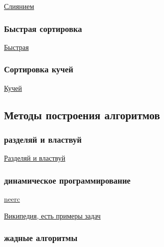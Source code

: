 \documentclass{article}
\begin{document}
\href{https://neerc.ifmo.ru/wiki/index.php?title=%D0%A1%D0%BE%D1%80%D1%82%D0%B8%D1%80%D0%BE%D0%B2%D0%BA%D0%B0_%D1%81%D0%BB%D0%B8%D1%8F%D0%BD%D0%B8%D0%B5%D0%BC}{Слиянием}

\subsubsection{Быстрая сортировка}

\href{https://neerc.ifmo.ru/wiki/index.php?title=%D0%91%D1%8B%D1%81%D1%82%D1%80%D0%B0%D1%8F_%D1%81%D0%BE%D1%80%D1%82%D0%B8%D1%80%D0%BE%D0%B2%D0%BA%D0%B0}{Быстрая}

\subsubsection{Сортировка кучей}

\href{https://neerc.ifmo.ru/wiki/index.php?title=%D0%A1%D0%BE%D1%80%D1%82%D0%B8%D1%80%D0%BE%D0%B2%D0%BA%D0%B0_%D0%BA%D1%83%D1%87%D0%B5%D0%B9}{Кучей}

\subsection{Методы построения алгоритмов}

\subsubsection{разделяй и властвуй}

\href{https://codechick.io/tutorials/dsa/dsa-divide-and-conquer}{Разделяй и властвуй}

\subsubsection{динамическое программирование}

\href{https://neerc.ifmo.ru/wiki/index.php?title=%D0%94%D0%B8%D0%BD%D0%B0%D0%BC%D0%B8%D1%87%D0%B5%D1%81%D0%BA%D0%BE%D0%B5_%D0%BF%D1%80%D0%BE%D0%B3%D1%80%D0%B0%D0%BC%D0%BC%D0%B8%D1%80%D0%BE%D0%B2%D0%B0%D0%BD%D0%B8%D0%B5}{neerc}

\href{https://ru.wikipedia.org/wiki/%D0%94%D0%B8%D0%BD%D0%B0%D0%BC%D0%B8%D1%87%D0%B5%D1%81%D0%BA%D0%BE%D0%B5_%D0%BF%D1%80%D0%BE%D0%B3%D1%80%D0%B0%D0%BC%D0%BC%D0%B8%D1%80%D0%BE%D0%B2%D0%B0%D0%BD%D0%B8%D0%B5}{Википедия, есть примеры задач}

\subsubsection{жадные алгоритмы}
\end{document}
